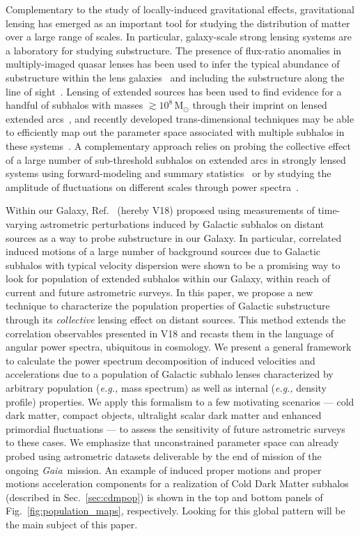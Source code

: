 \documentclass[twocolumn]{aastex63}
\newcommand{\Gaia}{\emph{Gaia}}
\begin{document}
Complementary to the study of locally-induced gravitational effects, gravitational lensing has emerged as an important tool for studying the distribution of matter over a large range of scales. In particular, galaxy-scale strong lensing systems are a laboratory for studying substructure. The presence of flux-ratio anomalies in multiply-imaged quasar lenses has been used to infer the typical abundance of substructure within the lens galaxies~\cite{astro-ph/0111456} and including the substructure along the line of sight~\cite{1905.04182}. Lensing of extended sources has been used to find evidence for a handful of subhalos with masses $\gtrsim 10^8\,\mathrm{M}_\odot$ through their imprint on lensed extended arcs~\cite{1601.01388,0910.0760,1201.3643}, and recently developed trans-dimensional techniques may be able to efficiently map out the parameter space associated with multiple subhalos in these systems~\cite{1508.00662,1706.06111}. A complementary approach relies on probing the collective effect of a large number of sub-threshold subhalos on extended arcs in strongly lensed systems using forward-modeling and summary statistics~\cite{1702.00009} or by studying the amplitude of fluctuations on different scales through power spectra~\cite{1403.2720,1809.00004,1707.04590,1806.07897,1808.03501,1710.03075,1506.01724}.  

Within our Galaxy, Ref.~\cite{VanTilburg:2018ykj} (hereby V18) proposed using measurements of time-varying astrometric perturbations induced by Galactic subhalos on distant sources as a way to probe substructure in our Galaxy. In particular, correlated induced motions of a large number of background sources due to Galactic subhalos with typical velocity dispersion were shown to be a promising way to look for population of extended subhalos within our Galaxy, within reach of current and future astrometric surveys. In this paper, we propose a new technique to characterize the population properties of Galactic substructure through its \emph{collective} lensing effect on distant sources. This method extends the correlation observables presented in V18 and recasts them in the language of angular power spectra, ubiquitous in cosmology. We present a general framework to calculate the power spectrum decomposition of induced velocities and accelerations due to a population of Galactic subhalo lenses characterized by arbitrary population (\emph{e.g.,} mass spectrum) as well as internal (\emph{e.g.,} density profile) properties. We apply this formalism to a few motivating scenarios --- cold dark matter, compact objects, ultralight scalar dark matter and enhanced primordial fluctuations --- to assess the sensitivity of future astrometric surveys to these cases. We emphasize that unconstrained parameter space can already probed using astrometric datasets deliverable by the end of mission of the ongoing \Gaia~mission. An example of induced proper motions and proper motions acceleration components for a realization of Cold Dark Matter subhalos (described in Sec.~\ref{sec:cdmpop}) is shown in the top and bottom panels of Fig.~\ref{fig:population_maps}, respectively. Looking for this global pattern will be the main subject of this paper.  
\end{document}
